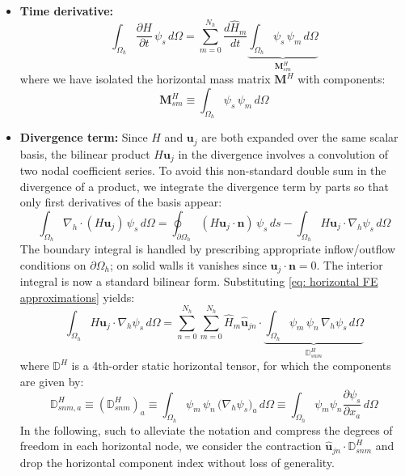 \documentclass{article}
\newcommand{\uj}{\mathbf{u}_j}
\newcommand{\nablah}{\nabla_h}
\newcommand{\ddt}[1]{\frac{\partial #1}{\partial t}}
\newcommand{\Nh}{N_h}
\newcommand{\sumNhn}{\sum_{n=0}^{\Nh}}
\newcommand{\sumNhm}{\sum_{m=0}^{\Nh}}
\newcommand{\uhjn}{\hat{\mathbf{u}}_{jn}}
\newcommand{\Hm}{\hat{H}_m}
\newcommand{\ddxa}[1]{\frac{\partial #1}{\partial x_a}}
\newcommand{\HMsm}{\mathbf{M}_{sm}^H}
\newcommand{\HDsnma}{\mathbb{D}_{snm}^H}
\newcommand{\HmM}{\mathbf{M}^H}
\newcommand{\HttD}{\mathbb{D}^H}
\begin{document}
\begin{itemize}
    \item \textbf{Time derivative:}
    $$\int_{\Omega_h} \ddt{H}\,\psi_s\,d\Omega = \sumNhm \frac{d\Hm}{dt}\underbrace{\int_{\Omega_h}\psi_s\,\psi_m\,d\Omega}_{\HMsm}$$
    where we have isolated the horizontal mass matrix $\HmM$ with components:
    \begin{equation}
        \boxed{\HMsm \equiv \int_{\Omega_h}\psi_s\,\psi_m\,d\Omega} 
    \end{equation}
 
    \item \textbf{Divergence term:} Since $H$ and $\uj$ are both expanded over the same scalar basis, the bilinear product $H\uj$ in the divergence involves a convolution of two nodal coefficient series.
    To avoid this non-standard double sum in the divergence of a product, we integrate the divergence term by parts so that only first derivatives of the basis appear:
    \begin{equation}
        \int_{\Omega_h}\nablah\cdot(H\uj)\,\psi_s\,d\Omega = \oint_{\partial\Omega_h}(H\uj\cdot\mathbf{n})\,\psi_s\,ds - \int_{\Omega_h} H\uj\cdot\nablah\psi_s\,d\Omega
        \label{eq: continuity IBP}
    \end{equation}
    The boundary integral is handled by prescribing appropriate inflow/outflow conditions on $\partial\Omega_h$; on solid walls it vanishes since $\uj\cdot\mathbf{n}=0$.
    The interior integral is now a standard bilinear form.  Substituting \eqref{eq: horizontal FE approximations} yields:
    \begin{equation}
        \int_{\Omega_h} H\uj\cdot\nablah\psi_s\,d\Omega
        = \sumNhn\sumNhm \Hm \uhjn \cdot \underbrace{\int_{\Omega_h} \psi_m\,\psi_n\,\nablah\psi_s\,d\Omega}_{\HDsnma}
        \label{eq: continuity interior integral 1}
    \end{equation}
    where $\HttD$ is a 4th-order static horizontal tensor, for which the components are given by:
    \begin{equation}
        \boxed{\mathbb{D}^H_{snm, a} \equiv (\HDsnma)_a \equiv \int_{\Omega_h} \psi_m\,\psi_n\,\big(\nablah\psi_s \big)_a\,d\Omega \equiv \int_{\Omega_h} \psi_m \psi_n \ddxa{\psi_s} \, d\Omega}
        \label{eq: def horizontal mass continuity divergence operator}
    \end{equation}
    In the following, such to alleviate the notation and compress the degrees of freedom in each horizontal node, we consider the contraction $\uhjn \cdot \HDsnma$ and drop the horizontal component index without loss of generality. 
\end{itemize}
\end{document}
